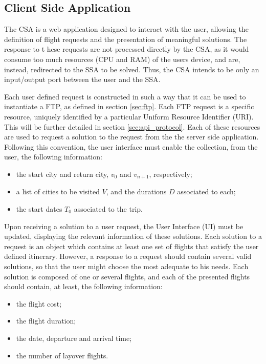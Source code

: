 \subsection{Client Side Application}
\label{sec:csa_design}

The CSA is a web application designed to interact with the user, allowing the definition of flight requests and the presentation of meaningful solutions. The response to t   hese requests are not processed directly by the CSA, as it would consume too much resources (CPU and RAM) of the users device, and are, instead, redirected to the SSA to be solved. Thus, the CSA intends to be only an input/output port between the user and the SSA. 

Each user defined request is constructed in such a way that it can be used to instantiate a FTP, as defined in section \ref{sec:ftp}. Each FTP request is a specific resource, uniquely identified by a particular Uniform Resource Identifier (URI). This will be further detailed in section \ref{sec:api_protocol}. Each of these resources are used to request a solution to the request from the the server side application. Following this convention, the user interface must enable the collection, from the user, the following information:

\begin{itemize}
  \item the start city and return city, $v_{0}$ and $v_{n+1}$, respectively;
  \item a list of cities to be visited $V$, and the durations $D$ associated to each;
  \item the start dates $T_{0}$ associated to the trip.
\end{itemize}

Upon receiving a solution to a user request, the User Interface (UI) must be updated, displaying the relevant information of these solutions. Each solution to a request is an object which contains at least one set of flights that satisfy the user defined itinerary. However, a response to a request should 
contain several valid solutions, so that the user might choose the most adequate to his needs.
Each solution is composed of one or several flights, and each of the presented flights should contain, at least, the following information:

\begin{itemize}
  \item the flight cost;
  \item the flight duration;
  \item the date, departure and arrival time;
  \item the number of layover flights.
\end{itemize}

